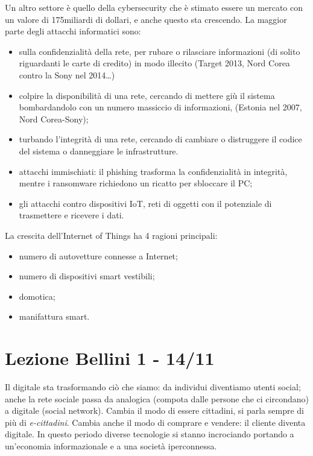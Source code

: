 \documentclass[a4page, 11pt]{article}
\begin{document}
Un altro settore è quello della cybersecurity che è stimato essere un mercato con un valore di 175miliardi di dollari, e anche questo sta crescendo.
La maggior parte degli attacchi informatici sono:
\begin{itemize}
  \item sulla confidenzialità della rete, per rubare o rilasciare informazioni (di solito riguardanti le carte di credito) in modo illecito (Target 2013, Nord Corea contro la Sony nel 2014\ldots{})
  \item colpire la disponibilità di una rete, cercando di mettere giù il sistema bombardandolo con un numero massiccio di informazioni, (Estonia nel 2007, Nord Corea-Sony);
  \item turbando l'integrità di una rete, cercando di cambiare o distruggere il codice del sistema o danneggiare le infrastrutture.
  \item attacchi immischiati: il phishing trasforma la confidenzialità in integrità, mentre i ransomware richiedono un ricatto per sbloccare il PC;
  \item gli attacchi contro dispositivi IoT, reti di oggetti con il potenziale di trasmettere e ricevere i dati.
\end{itemize}

La crescita dell'Internet of Things ha 4 ragioni principali:
\begin{itemize}
  \item numero di autovetture connesse a Internet;
  \item numero di dispositivi smart vestibili;
  \item domotica;
  \item manifattura smart.
\end{itemize}




\section*{Lezione Bellini 1 - 14/11}
Il digitale sta trasformando ciò che siamo: da individui diventiamo utenti social; anche la rete sociale passa da analogica (compota dalle persone che ci circondano) a digitale (social network).
Cambia il modo di essere cittadini, si parla sempre di più di \textit{e-cittadini}.
Cambia anche il modo di comprare e vendere: il cliente diventa digitale.
In questo periodo diverse tecnologie si stanno incrociando portando a un'economia informazionale e a una società iperconnessa.
\end{document}
